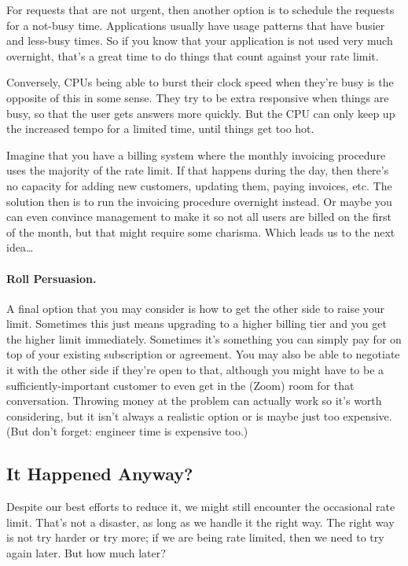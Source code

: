 For requests that are not urgent, then another option is to schedule the requests for a not-busy time. Applications usually have usage patterns that have busier and less-busy times. So if you know that your application is not used very much overnight, that's a great time to do things that count against your rate limit.

Conversely, CPUs being able to burst their clock speed when they're busy is the opposite of this in some sense. They try to be extra responsive when things are busy, so that the user gets answers more quickly. But the CPU can only keep up the increased tempo for a limited time, until things get too hot.

Imagine that you have a billing system where the monthly invoicing procedure uses the majority of the rate limit. If that happens during the day, then there's no capacity for adding new customers, updating them, paying invoices, etc. The solution then is to run the invoicing procedure overnight instead. Or maybe you can even convince management to make it so not all users are billed on the first of the month, but that might require some charisma. Which leads us to the next idea\ldots

\paragraph{Roll Persuasion.}
A final option that you may consider is how to get the other side to raise your limit. Sometimes this just means upgrading to a higher billing tier and you get the higher limit immediately. Sometimes it's something you can simply pay for on top of your existing subscription or agreement. You may also be able to negotiate it with the other side if they're open to that, although you might have to be a sufficiently-important customer to even get in the (Zoom) room for that conversation. Throwing money at the problem can actually work so it's worth considering, but it isn't always a realistic option or is maybe just too expensive. (But don't forget: engineer time is expensive too.)

\subsection*{It Happened Anyway?}

Despite our best efforts to reduce it, we might still encounter the occasional rate limit. That's not a disaster, as long as we handle it the right way. The right way is not try harder or try more; if we are being rate limited, then we need to try again later. But how much later?

